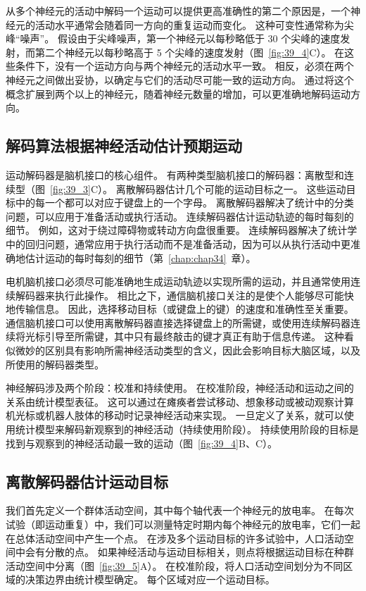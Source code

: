 从多个神经元的活动中解码一个运动可以提供更高准确性的第二个原因是，一个神经元的活动水平通常会随着同一方向的重复运动而变化。
这种可变性通常称为尖峰“噪声”。
假设由于尖峰噪声，第一个神经元以每秒略低于 30 个尖峰的速度发射，而第二个神经元以每秒略高于 5 个尖峰的速度发射（图~\ref{fig:39_4}C）。
在这些条件下，没有一个运动方向与两个神经元的活动水平一致。
相反，必须在两个神经元之间做出妥协，以确定与它们的活动尽可能一致的运动方向。
通过将这个概念扩展到两个以上的神经元，随着神经元数量的增加，可以更准确地解码运动方向。



\subsection{解码算法根据神经活动估计预期运动}

运动解码器是脑机接口的核心组件。 
有两种类型脑机接口的解码器：离散型和连续型（图~\ref{fig:39_3}C）。
离散解码器估计几个可能的运动目标之一。
这些运动目标中的每一个都可以对应于键盘上的一个字母。
离散解码器解决了统计中的分类问题，可以应用于准备活动或执行活动。
连续解码器估计运动轨迹的每时每刻的细节。
例如，这对于绕过障碍物或转动方向盘很重要。
连续解码器解决了统计学中的回归问题，通常应用于执行活动而不是准备活动，因为可以从执行活动中更准确地估计运动的每时每刻的细节（第~\ref{chap:chap34}~章）。


电机脑机接口必须尽可能准确地生成运动轨迹以实现所需的运动，并且通常使用连续解码器来执行此操作。
相比之下，通信脑机接口关注的是使个人能够尽可能快地传输信息。
因此，选择移动目标（或键盘上的键）的速度和准确性至关重要。
通信脑机接口可以使用离散解码器直接选择键盘上的所需键，或使用连续解码器连续将光标引导至所需键，其中只有最终敲击的键才真正有助于信息传递。
这种看似微妙的区别具有影响所需神经活动类型的含义，因此会影响目标大脑区域，以及所使用的解码器类型。


神经解码涉及两个阶段：校准和持续使用。
在校准阶段，神经活动和运动之间的关系由统计模型表征。
这可以通过在瘫痪者尝试移动、想象移动或被动观察计算机光标或机器人肢体的移动时记录神经活动来实现。
一旦定义了关系，就可以使用统计模型来解码新观察到的神经活动（持续使用阶段）。
持续使用阶段的目标是找到与观察到的神经活动最一致的运动（图~\ref{fig:39_4}B、C）。



\subsection{离散解码器估计运动目标}

我们首先定义一个群体活动空间，其中每个轴代表一个神经元的放电率。
在每次试验（即运动重复）中，我们可以测量特定时期内每个神经元的放电率，它们一起在总体活动空间中产生一个点。
在涉及多个运动目标的许多试验中，人口活动空间中会有分散的点。
如果神经活动与运动目标相关，则点将根据运动目标在种群活动空间中分离（图~\ref{fig:39_5}A）。
在校准阶段，将人口活动空间划分为不同区域的决策边界由统计模型确定。
每个区域对应一个运动目标。


